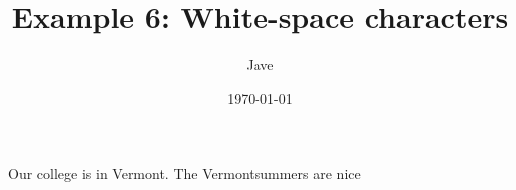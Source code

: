 \documentclass{article}
\newcommand{\Exnewcommand}{\textbackslash{}newcommand\{\}\xspace}
\newcommand{\commandEx}{\textbackslash{}command}
\newcommand{\VT}{Vermont}
\begin{document}
\title{Example 6: White-space characters}
\date{\today}
\author{Jave}
\maketitle






Our college is in \VT.
The \VT summers are nice
\end{document}
